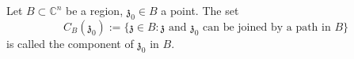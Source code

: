 Let $B \subset \mathbb{C}^n$ be a region, $\mathfrak{z}_0 \in B$ a point. The set
$$C_B(\mathfrak{z}_0) := \{ \mathfrak{z} \in B: \mathfrak{z} \text{ and } \mathfrak{z}_0 \text{ can be joined by a path in } B \}$$
is called the component of $\mathfrak{z}_0$ in $B$.
